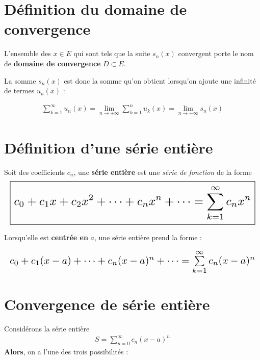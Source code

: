 \documentclass{report}
\begin{document}
\begin{multicols*}{3}
    \section{Définition du domaine de convergence}
    L'ensemble des $x \in E$ qui sont tels que la suite $s_n(x)$ 
    convergent porte le nom de  
    \textbf{\textcolor{myb}{domaine de convergence}} $D \subset E$.    

    La somme $s_n(x)$ est donc la somme qu'on obtient lorsqu'on 
    ajoute une infinité de termes $u_n(x)$ :
 
    \begin{align*}
    \boxed{
        \sum\limits_{k=1}^{\infty }u_n(x) = 
        \lim\limits_{n \to+\infty } 
        \sum\limits_{k=1}^{n}u_k(x) =  
        \lim\limits_{n \to +\infty } s_n(x) 
    }
    \end{align*}

    \vspace{-2em}
    \section{Définition d'une série entière}

    Soit des coefficients $c_n$, 
    une \textbf{série entière} est une \textit{série de fonction}     
    de la forme 
    \begin{align*}
    \resizebox{1\linewidth}{!}{$ 
    \boxed{
        c_0 + c_1x + c_2x^2 + \cdots + c_nx^n + \cdots = 
        \sum\limits_{k=1}^{\infty }  c_nx^n  
    }
$}
    \end{align*} 

    Lorsqu'elle est \textbf{centrée en} $a$, une série entière prend la forme : 

    \begin{align*}
        \resizebox{\linewidth}{!}{$
         c_0 + c_1(x - a) + \cdots + c_n(x - a)^n + \cdots = 
        \sum\limits_{k=1}^{\infty }  c_n(x - a)^n  
    $}
    \end{align*}    


    \vspace{-1.5em}
    \section{Convergence de série entière}
    \vspace{-0.5em}
        Considérons la série entière 
        \begin{align*}
           S = \sum_{n=0}^{\infty }c_n(x - a)^n 
        \end{align*}
        \textbf{Alors}, on a l'une des trois possibilités : 


\end{multicols*}
\end{document}

